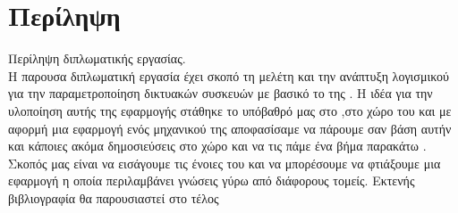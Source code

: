 \chapter*{Περίληψη}

Περίληψη διπλωματικής εργασίας.\\

\noindent H παρουσα διπλωματική εργασία έχει σκοπό τη μελέτη και την ανάπτυξη λογισμικού
για την παραμετροποίηση δικτυακών συσκευών με βασικό  το  της .
Η ιδέα για την υλοποίηση αυτής της εφαρμογής στάθηκε το υπόβαθρό μας στο 
,στο χώρο του  και με αφορμή μια εφαρμογή ενός μηχανικού της  αποφασίσαμε να πάρουμε σαν βάση
αυτήν και κάποιες ακόμα δημοσιεύσεις στο χώρο και να τις πάμε ένα βήμα παρακάτω
. Σκοπός μας είναι να εισάγουμε τις ένοιες του    
και να μπορέσουμε να φτιάξουμε μια εφαρμογή η οποία περιλαμβάνει γνώσεις γύρω από διάφορους τομείς.
 Εκτενής βιβλιογραφία θα παρουσιαστεί στο τέλος

